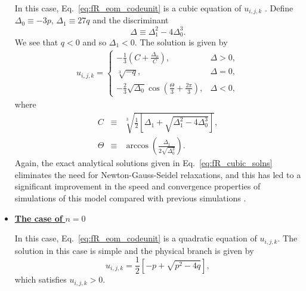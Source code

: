 \begin{itemize}
    In this case, Eq.~\eqref{eq:fR_eom_codeunit} is a cubic equation of $u_{i,j,k}$ \cite{Bose:2016wms}. Define $\Delta_0 \equiv -3p$, $\Delta_1 \equiv 27 q$ and the discriminant 
    \begin{equation}
        \Delta \equiv \Delta_1^2-4\Delta_0^3.
    \end{equation}
    We see that $q<0$ and so $\Delta_1<0$. The solution is given by
    \begin{align}\label{eq:fR_cubic_solns}
        u_{i,j,k} = \begin{cases}
            \displaystyle -\frac{1}{3}\left(C+\frac{\Delta_0}{C}\right), & \Delta>0, \\
            \displaystyle \sqrt[3]{-q}, & \Delta=0, \\
            \displaystyle -\frac{2}{3}\sqrt{\Delta_0}\cos\left(\frac{\Theta}{3} + \frac{2\pi}{3}\right), & \Delta<0,
        \end{cases} 
    \end{align}
    where 
    \begin{eqnarray}
        C &\equiv& \sqrt[3]{\frac{1}{2}\left[\Delta_1+\sqrt{\Delta_1^2-4 \Delta_0^3}\right]},\\
        \Theta &\equiv& \arccos \left(\frac{\Delta_1}{2\sqrt{\Delta_0^3}}\right).
    \end{eqnarray}
    Again, the exact analytical solutions given in Eq.~\eqref{eq:fR_cubic_solns} eliminates the need for Newton-Gauss-Seidel relaxations, and this has led to a significant improvement in the speed and convergence properties of simulations of this model compared with previous simulations \cite{Bose:2016wms}.
    
    \item {\underline{\textbf{The case of} $n=0$}} 
    
    In this case, Eq.~\eqref{eq:fR_eom_codeunit} is a quadratic equation of $u_{i,j,k}$. The solution in this case is simple and the physical branch is given by
    \begin{equation}\label{eq:fR_quadratic_solns}
        u_{i,j,k} = \frac{1}{2}\left[-p+\sqrt{p^2-4q}\right],
    \end{equation}
    which satisfies $u_{i,j,k}>0$.
    
\end{itemize}

